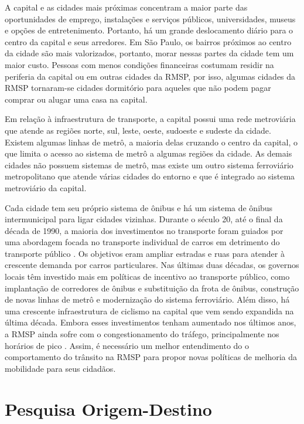A capital e as cidades mais próximas concentram a maior parte das oportunidades
de emprego, instalações e serviços públicos, universidades, museus e opções
de entretenimento. Portanto, há um grande deslocamento diário para o centro da
capital e seus arredores. Em São Paulo, os bairros próximos ao centro da
cidade são mais valorizados, portanto, morar nessas partes da cidade tem um maior custo.
Pessoas com menos condições financeiras costumam residir na periferia da capital
ou em outras cidades da RMSP, por isso, algumas cidades da RMSP tornaram-se cidades
dormitório para aqueles que não podem pagar comprar ou alugar uma casa na
capital.

Em relação à infraestrutura de transporte, a capital possui uma rede metroviária
que atende as regiões norte, sul, leste, oeste, sudoeste e sudeste da cidade.
Existem algumas linhas de metrô, a maioria delas cruzando o centro da capital, o
que limita o acesso ao sistema de metrô a algumas regiões da cidade. As demais
cidades não possuem sistemas de metrô, mas existe um outro sistema ferroviário
metropolitano que atende várias cidades do entorno e que é integrado ao sistema
metroviário da capital.

Cada cidade tem seu próprio sistema de ônibus e há um sistema de ônibus
intermunicipal para ligar cidades vizinhas. Durante o século 20, até o final da
década de 1990, a maioria dos investimentos no transporte foram guiados por uma
abordagem focada no transporte individual de carros em detrimento do transporte
público \citep{rolnik2011}. Os objetivos eram ampliar estradas e ruas para
atender à crescente demanda por carros particulares. Nas últimas duas décadas,
os governos locais têm investido mais em políticas de incentivo ao transporte
público, como implantação de corredores de ônibus e substituição da frota de
ônibus, construção de novas linhas de metrô e modernização do sistema
ferroviário. Além disso, há uma crescente infraestrutura de ciclismo na capital
que vem sendo expandida na última década. Embora esses investimentos tenham
aumentado nos últimos anos, a RMSP ainda sofre com o congestionamento do
tráfego, principalmente nos horários de pico \citep{rolnik2011,ricardo:18}.
Assim, é necessário um melhor entendimento do o comportamento do trânsito na
RMSP para propor novas políticas de melhoria da mobilidade para seus cidadãos.



\section{Pesquisa Origem-Destino}
\label{sec:pesquisa-od}

